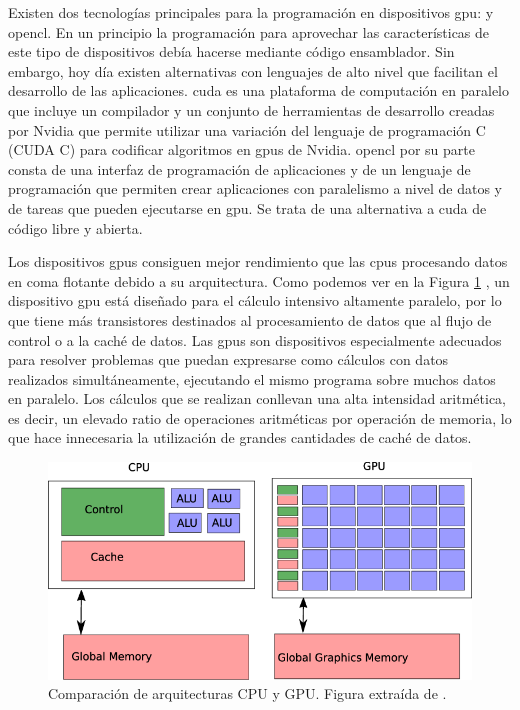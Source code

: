 Existen dos tecnologías principales para la programación en dispositivos \gls{gpu}:  y \gls{opencl}.
En un principio la programación para aprovechar las características de este tipo de dispositivos debía hacerse mediante código ensamblador.
Sin embargo, hoy día existen alternativas con lenguajes de alto nivel que facilitan el desarrollo de las aplicaciones.
\gls{cuda} \citep{Luebke2008} es una plataforma de computación en paralelo que incluye un compilador y un conjunto de herramientas de desarrollo creadas por Nvidia que permite utilizar una variación del lenguaje de programación C (CUDA C) para codificar algoritmos en \gls{gpu}s de Nvidia.
\gls{opencl} \citep{Stone2010} por su parte consta de una interfaz de programación de aplicaciones y de un lenguaje de programación que permiten crear aplicaciones con paralelismo a nivel de datos y de tareas que pueden ejecutarse en \gls{gpu}.
Se trata de una alternativa a \gls{cuda} de código libre y abierta.

Los dispositivos \gls{gpu}s consiguen mejor rendimiento que las \gls{cpu}s procesando datos en coma flotante debido a su arquitectura.
Como podemos ver en la Figura \ref{fig:comparacion-cpu-gpu} \citep{Stopper2017}, un dispositivo \gls{gpu} está diseñado para el cálculo intensivo altamente paralelo, por lo que tiene más transistores destinados al procesamiento de datos que al flujo de control o a la caché de datos.
Las \gls{gpu}s son dispositivos especialmente adecuados para resolver problemas que puedan expresarse como cálculos con datos realizados
simultáneamente, ejecutando el mismo programa sobre muchos datos en paralelo.
Los cálculos que se realizan conllevan una alta intensidad aritmética, es decir, un elevado ratio de operaciones aritméticas por operación de memoria, lo que hace innecesaria la utilización de grandes cantidades de caché de datos.

\begin{figure}[h]
    \centering
    \includegraphics[width=0.7\linewidth]{archivos/comparativa-cpu-gpu.png}
    \caption{Comparación de arquitecturas CPU y GPU. Figura extraída de \cite{Stopper2017}.}
    \label{fig:comparacion-cpu-gpu}
\end{figure}

